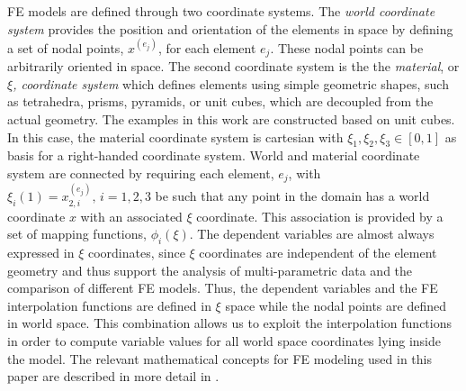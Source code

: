 \documentclass[journal]{vgtc}                %
\begin{document}
FE models are defined through two coordinate systems. The \emph{world coordinate system} provides the position and orientation of the elements in space by defining a set of nodal points, $x^{(e_j)}$, for each element $e_j$. These nodal points can be arbitrarily oriented in space. The second coordinate system is the the \emph{material}, or \emph{$\xi$, coordinate system} which defines elements using simple geometric shapes, such as tetrahedra, prisms, pyramids, or unit cubes, which are decoupled from the actual geometry. The examples in this work are constructed based on unit cubes. In this case, the material coordinate system is cartesian with $\xi_1, \xi_2, \xi_3 \in [0,1]$ as basis for a right-handed coordinate system. World and material coordinate system are connected by requiring each element, $e_j$, with $\xi_i(1)=x^{(e_j)}_{2,i},\, i=1,2,3$ be such that any point in the domain has a world coordinate $x$ with an associated $\xi$ coordinate. This association is provided by a set of mapping functions, $\phi_i(\xi)$. The dependent variables are almost always expressed in $\xi$ coordinates, since $\xi$ coordinates are independent of the element geometry and thus support the analysis of multi-parametric data and the comparison of different FE models. Thus, the dependent variables and the FE interpolation functions are defined in $\xi$ space while the nodal points are defined in world space. This combination allows us to exploit the interpolation functions in order to compute variable values for all world space coordinates lying inside the model. The relevant mathematical concepts for FE modeling used in this paper are described in more detail in \cite{wuensche03deformation,bradley97, szabo_book, schwab_book, karniadakis_book}.
%
\end{document}
